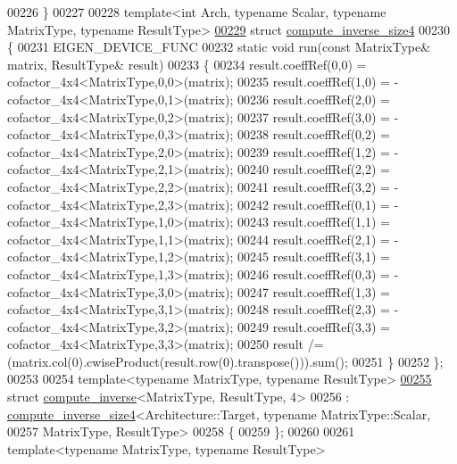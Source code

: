 \begin{DoxyCode}
00226 \}
00227 
00228 \textcolor{keyword}{template}<\textcolor{keywordtype}{int} Arch, \textcolor{keyword}{typename} Scalar, \textcolor{keyword}{typename} MatrixType, \textcolor{keyword}{typename} ResultType>
\hyperlink{struct_eigen_1_1internal_1_1compute__inverse__size4}{00229} \textcolor{keyword}{struct }\hyperlink{struct_eigen_1_1internal_1_1compute__inverse__size4}{compute\_inverse\_size4}
00230 \{
00231   EIGEN\_DEVICE\_FUNC
00232   \textcolor{keyword}{static} \textcolor{keywordtype}{void} run(\textcolor{keyword}{const} MatrixType& matrix, ResultType& result)
00233   \{
00234     result.coeffRef(0,0) =  cofactor\_4x4<MatrixType,0,0>(matrix);
00235     result.coeffRef(1,0) = -cofactor\_4x4<MatrixType,0,1>(matrix);
00236     result.coeffRef(2,0) =  cofactor\_4x4<MatrixType,0,2>(matrix);
00237     result.coeffRef(3,0) = -cofactor\_4x4<MatrixType,0,3>(matrix);
00238     result.coeffRef(0,2) =  cofactor\_4x4<MatrixType,2,0>(matrix);
00239     result.coeffRef(1,2) = -cofactor\_4x4<MatrixType,2,1>(matrix);
00240     result.coeffRef(2,2) =  cofactor\_4x4<MatrixType,2,2>(matrix);
00241     result.coeffRef(3,2) = -cofactor\_4x4<MatrixType,2,3>(matrix);
00242     result.coeffRef(0,1) = -cofactor\_4x4<MatrixType,1,0>(matrix);
00243     result.coeffRef(1,1) =  cofactor\_4x4<MatrixType,1,1>(matrix);
00244     result.coeffRef(2,1) = -cofactor\_4x4<MatrixType,1,2>(matrix);
00245     result.coeffRef(3,1) =  cofactor\_4x4<MatrixType,1,3>(matrix);
00246     result.coeffRef(0,3) = -cofactor\_4x4<MatrixType,3,0>(matrix);
00247     result.coeffRef(1,3) =  cofactor\_4x4<MatrixType,3,1>(matrix);
00248     result.coeffRef(2,3) = -cofactor\_4x4<MatrixType,3,2>(matrix);
00249     result.coeffRef(3,3) =  cofactor\_4x4<MatrixType,3,3>(matrix);
00250     result /= (matrix.col(0).cwiseProduct(result.row(0).transpose())).sum();
00251   \}
00252 \};
00253 
00254 \textcolor{keyword}{template}<\textcolor{keyword}{typename} MatrixType, \textcolor{keyword}{typename} ResultType>
\hyperlink{struct_eigen_1_1internal_1_1compute__inverse_3_01_matrix_type_00_01_result_type_00_014_01_4}{00255} \textcolor{keyword}{struct }\hyperlink{struct_eigen_1_1internal_1_1compute__inverse}{compute\_inverse}<MatrixType, ResultType, 4>
00256  : \hyperlink{struct_eigen_1_1internal_1_1compute__inverse__size4}{compute\_inverse\_size4}<Architecture::Target, typename MatrixType::Scalar,
00257                             MatrixType, ResultType>
00258 \{
00259 \};
00260 
00261 \textcolor{keyword}{template}<\textcolor{keyword}{typename} MatrixType, \textcolor{keyword}{typename} ResultType>

\end{DoxyCode}
